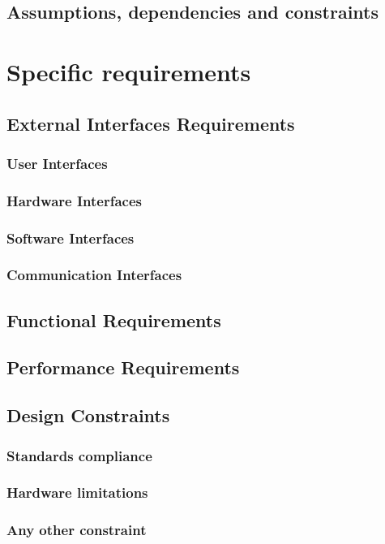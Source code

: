 \documentclass{article}
\begin{document}
	\subsection{Assumptions, dependencies and constraints}
	
	
	\section{Specific requirements}
	\subsection{External Interfaces Requirements}
	\subsubsection{User Interfaces}
	\subsubsection{Hardware Interfaces}
	\subsubsection{Software Interfaces}
	\subsubsection{Communication Interfaces}
	\subsection{Functional Requirements}
	\subsection{Performance Requirements}
	\subsection{Design Constraints}
	\subsubsection{Standards compliance}
	\subsubsection{Hardware limitations}
	\subsubsection{Any other constraint}
\end{document}
